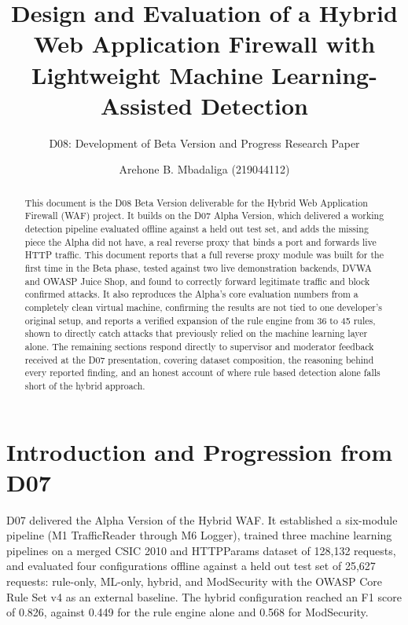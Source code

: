 \documentclass{llncs}
\begin{document}
\title{Design and Evaluation of a Hybrid Web Application Firewall with Lightweight Machine Learning-Assisted Detection}
\subtitle{D08: Development of Beta Version and Progress Research Paper}

\author{Arehone B. Mbadaliga (219044112)}

\maketitle

\begin{abstract}
This document is the D08 Beta Version deliverable for the Hybrid Web
Application Firewall (WAF) project. It builds on the D07 Alpha Version,
which delivered a working detection pipeline evaluated offline against a
held out test set, and adds the missing piece the Alpha did not have, a
real reverse proxy that binds a port and forwards live HTTP traffic. This
document reports that a full reverse proxy module was built for the first
time in the Beta phase, tested against two live demonstration backends,
DVWA and OWASP Juice Shop, and found to correctly forward legitimate
traffic and block confirmed attacks. It also reproduces the Alpha's core
evaluation numbers from a completely clean virtual machine, confirming the
results are not tied to one developer's original setup, and reports a
verified expansion of the rule engine from 36 to 45 rules, shown to
directly catch attacks that previously relied on the machine learning
layer alone. The remaining
sections respond directly to supervisor and moderator feedback received
at the D07 presentation, covering dataset composition, the reasoning
behind every reported finding, and an honest account of where rule based
detection alone falls short of the hybrid approach.
\end{abstract}

\clearpage
\section{Introduction and Progression from D07}

D07 delivered the Alpha Version of the Hybrid WAF. It established a
six-module pipeline (M1 TrafficReader through M6 Logger), trained three
machine learning pipelines on a merged CSIC 2010 and HTTPParams dataset
of 128{,}132 requests, and evaluated four configurations offline against
a held out test set of 25{,}627 requests: rule-only, ML-only, hybrid, and
ModSecurity with the OWASP Core Rule Set v4 as an external baseline. The
hybrid configuration reached an F1 score of 0.826, against 0.449 for the
rule engine alone and 0.568 for ModSecurity.
\end{document}
